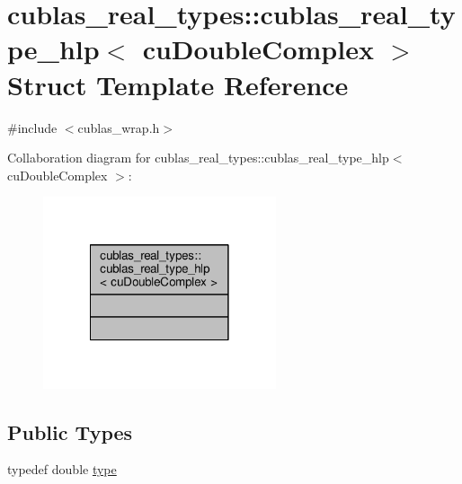 \hypertarget{structcublas__real__types_1_1cublas__real__type__hlp_3_01cuDoubleComplex_01_4}{\section{cublas\-\_\-real\-\_\-types\-:\-:cublas\-\_\-real\-\_\-type\-\_\-hlp$<$ cu\-Double\-Complex $>$ Struct Template Reference}
\label{structcublas__real__types_1_1cublas__real__type__hlp_3_01cuDoubleComplex_01_4}
}


{\ttfamily \#include $<$cublas\-\_\-wrap.\-h$>$}



Collaboration diagram for cublas\-\_\-real\-\_\-types\-:\-:cublas\-\_\-real\-\_\-type\-\_\-hlp$<$ cu\-Double\-Complex $>$\-:\nopagebreak
\begin{figure}[H]
\begin{center}
\leavevmode
\includegraphics[width=194pt]{structcublas__real__types_1_1cublas__real__type__hlp_3_01cuDoubleComplex_01_4__coll__graph}
\end{center}
\end{figure}
\subsection*{Public Types}
\begin{DoxyCompactItemize}
\item 
typedef double \hyperlink{structcublas__real__types_1_1cublas__real__type__hlp_3_01cuDoubleComplex_01_4_a551952c60dae7ba15565b979aa908d31}{type}
\end{DoxyCompactItemize}


